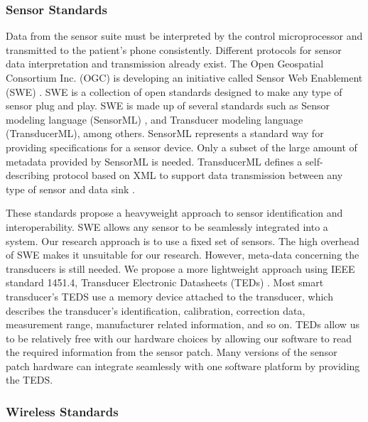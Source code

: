 \subsubsection{Sensor Standards}
\label{subsec:SensorStandars}
Data from the sensor suite must be interpreted by the control microprocessor and transmitted to the patient's phone consistently. Different protocols for sensor data interpretation and transmission already exist.  The Open Geospatial Consortium Inc. (OGC) is developing an initiative called Sensor Web Enablement (SWE) \cite{Botts2007a}. SWE is a collection of open standards designed to make any type of sensor plug and play. SWE is made up of several standards such as Sensor modeling language (SensorML) \cite{Botts2007}, and Transducer modeling language (TransducerML), among others. SensorML represents a standard way for providing specifications for a sensor device. Only a subset of the large amount of metadata provided by SensorML is needed. TransducerML defines a self-describing protocol based on XML to support data transmission between any type of sensor and data sink \cite{Fortier2009}.

These standards propose a heavyweight approach to sensor identification and interoperability. SWE allows any sensor to be seamlessly integrated into a system. Our research approach is to use a fixed set of sensors. The high overhead of SWE makes it unsuitable for our research. However, meta-data concerning the transducers is still needed. We propose a more lightweight approach using IEEE standard 1451.4, Transducer Electronic Datasheets (TEDs) . Most smart transducer's TEDS use a memory device attached to the transducer, which describes the transducer's identification, calibration, correction data, measurement range, manufacturer related information, and so on. TEDs allow us to be relatively free with our hardware choices by allowing our software to read the required information from the sensor patch. Many versions of the sensor patch hardware can integrate seamlessly with one software platform by providing the TEDS. \cite{IEEE1451_4}


\subsubsection{Wireless Standards}
\label{subsubsec:WirelessStandards}

